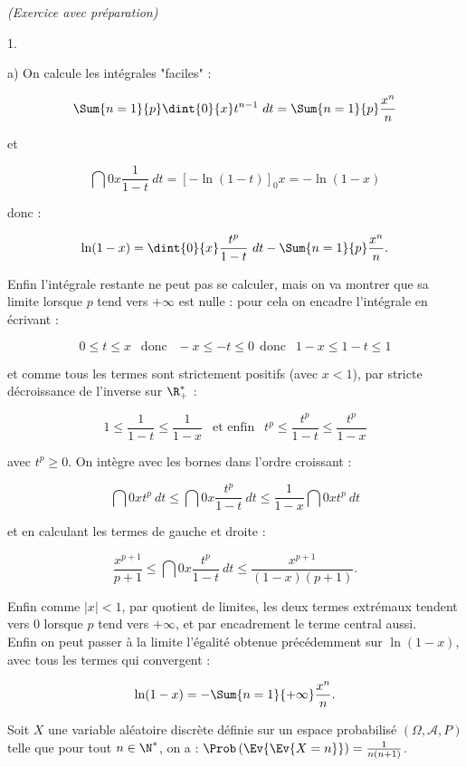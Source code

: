 \documentclass[11pt]{article}%
\begin{document}
\begin{exercice}{\it (Exercice avec préparation)}
\begin{noliste}{1.}
\begin{noliste}{a)}
 On calcule les intégrales "faciles" : 
 
\[
 \Sum{n = 1}{p} \dint{0}{x} t^{n-1} \ dt = \Sum{n = 1}{p} \frac{ x^{n}
}{ n } 
\]


 et
 
\[
 \dint{0}{x} \frac{ 1 }{ 1-t } \ dt = \left[ - \ln (1 - t)
\right]_{0}{x} = - \ln (1-x ) 
\]

 donc :
 
\[
 \ln (1-x ) = \dint{0}{x} \frac{ t^{p} }{ 1-t } \ dt - \Sum{n = 1}{p}
\frac{ x^{n} }{ n }. 
\]

 Enfin l'intégrale restante ne peut pas se calculer, mais on va montrer
que sa limite lorsque $p$ tend vers $ + \infty$ est nulle : pour cela
on encadre l'intégrale en écrivant : 
 
\[
 0 \leq t \leq x \ \ \text{ donc } \ \ - x \leq -t \leq 0 \ \ \text{
donc } \ \ 1-x \leq 1-t \leq 1 
\]

 et comme tous les termes sont strictement positifs (avec $x < 1$), par
stricte décroissance de l'inverse sur $\R_+^*$ : 
 
\[
 1 \leq \frac{ 1 }{ 1-t } \leq \frac{ 1 }{ 1-x } \ \ \text{ et enfin }
\ \ t^{p} \leq \frac{ t^{p} }{ 1-t } \leq \frac{ t^{p} }{ 1 - x } 
\]

 avec $t^{p} \geq 0$. On intègre avec les bornes dans l'ordre croissant
: 
 
\[
 \dint{0}{x} t^{p} \ dt \leq \dint{0}{x} \frac{ t^{p} }{ 1-t } \ dt
\leq \frac{1}{1-x} \dint{0}{x} t^{p} \ dt 
\]

 et en calculant les termes de gauche et droite : 
 
\[
 \frac{ x^{p + 1} }{ p + 1 } \leq \dint{0}{x} \frac{ t^{p} }{ 1-t } \
dt \leq \frac{ x^{p + 1} }{ (1-x) (p + 1) }. 
\]

 Enfin comme $ | x | < 1$, par quotient de limites, les deux termes
extrémaux tendent vers 0 lorsque $p$ tend vers $ + \infty$, et par
encadrement le terme central aussi. \\

 Enfin on peut passer à la limite l'égalité obtenue précédemment sur
$\ln (1-x)$, avec tous les termes qui convergent : 
 
\[
 \ln (1-x ) = - \Sum{n = 1}{+ \infty} \frac{ x^{n} }{ n }. 
\]

 \end{noliste}

 \item Soit $X$ une variable aléatoire discrète définie sur un espace
probabilisé $(\Omega, \mathcal{A}, P)$ telle que pour tout $n \in
\N^*$, on a : $\Prob\left(\Ev{\Ev{X = n}}\right) = \frac{ 1 }{ n ( n +
1) }$.


\end{noliste}
\end{exercice}
\end{document}
